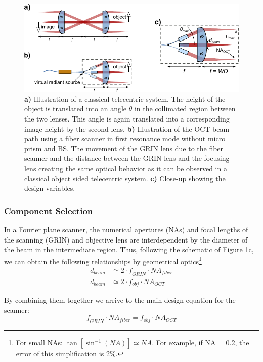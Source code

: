 \begin{figure}[h!]\centering \includegraphics[width=\columnwidth]{figures/30_DesignSimulation/fps.pdf}
      \caption{\textbf{a)} Illustration of a classical telecentric system. The height of the object is translated into an angle $\theta$ in the collimated region between the two lenses. This angle is again translated into a corresponding image height by the second lens. \textbf{b)} Illustration of the OCT beam path using a fiber scanner in first resonance mode without micro prism and BS. The movement of the GRIN lens due to the fiber scanner and the distance between the GRIN lens and the focusing lens creating the same optical behavior as it can be observed in a classical object sided telecentric system. \textbf{c)} Close-up showing the design variables.}
      \label{fig:fps}
\end{figure}

\subsubsection*{Component Selection}

In a Fourier plane scanner, the numerical apertures (NAs) and focal lengths of the scanning (GRIN) and objective lens are interdependent by the diameter of the beam in the intermediate region. Thus, following the schematic of Figure \ref{fig:fps}c, we can obtain the following relationships by geometrical optics\footnote{For small NAs: $\tan[	\sin^{-1}(\mathit{NA})] \simeq \mathit{NA} $. For example, if NA = 0.2, the error of this simplification is 2\%. }
\begin{align}
d_{beam} &\simeq 2\cdot \mathit{f_{GRIN}}\cdot \mathit{NA_{fiber}} \\
d_{beam} &\simeq 2 \cdot f_{obj}\cdot \mathit{NA_{OCT}}
\label{eq:fpsNA}
\end{align}

By combining them together we arrive to the main design equation for the scanner:
\begin{equation}
\mathit{f_{GRIN}} \cdot \mathit{NA_{fiber}} = f_{obj} \cdot \mathit{NA_{OCT}}
\end{equation}

